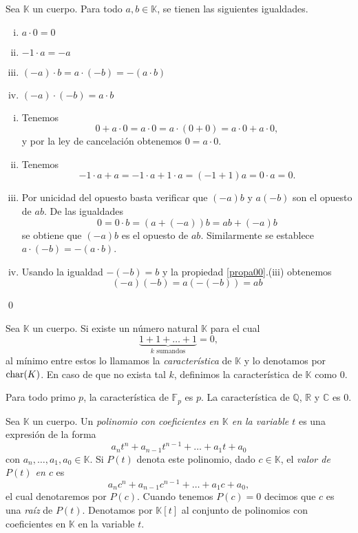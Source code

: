 \begin{prop}\label{propa00}
Sea $\mathbb{K}$ un cuerpo. Para todo $a,b\in \mathbb{K}$, se tienen las siguientes igualdades.
\begin{enumerate}[(i)]
\item $a\cdot 0=0$
\item $-1\cdot a=-a$
\item $(-a)\cdot b=a\cdot(-b)=-(a\cdot b)$
\item $(-a)\cdot (-b)=a\cdot b$
\end{enumerate}
\end{prop}

\dem
\begin{enumerate}[(i)]
\item Tenemos
\[
0+a\cdot 0=a\cdot 0=a\cdot (0+0)=a\cdot 0+ a\cdot 0,
\]
y por la ley de cancelación obtenemos $0=a\cdot 0$.
\item Tenemos
\[
-1\cdot a+a=-1\cdot a+1\cdot a=(-1+1)a=0\cdot a=0.
\]
\item Por unicidad del opuesto basta verificar que $(-a)b$ y $a(-b)$ son el opuesto de $ab$. De las igualdades
\[
0=0\cdot b=\left( a+(-a)\right) b=ab+(-a)b
\]
se obtiene que $(-a)b$ es el opuesto de $ab$. Similarmente se establece $a\cdot(-b)=-(a\cdot b)$.
\item Usando la igualdad $-(-b)=b$ y la propiedad \ref{propa00}.(iii) obtenemos
\[
(-a)(-b)=a\left(-(-b)\right) =ab
\]
\end{enumerate}\qed

\begin{defn}
Sea $\mathbb{K}$ un cuerpo. Si existe un número natural $\mathbb{K}$ para el cual
\[
\underbrace{1+1+\ldots+1}_{k \textrm{ sumandos}}=0,
\]
al mínimo entre estos lo llamamos la \emph{característica} de $\mathbb{K}$ y lo denotamos por $\operatorname{char}(K)$. En caso de que no exista tal $k$, definimos la característica de $\mathbb{K}$ como $0$.   
\end{defn}

\begin{obs}
Para todo primo $p$, la característica de $\mathbb{F}_p$ es $p$. La característica de $\mathbb{Q}$, $\mathbb{R}$ y $\mathbb{C}$ es $0$.
\end{obs}

\begin{defn}
Sea $\mathbb{K}$ un cuerpo. Un \emph{polinomio con coeficientes en $\mathbb{K}$ en la variable $t$} es una expresión de la forma
$$a_nt^n+a_{n-1}t^{n-1}+\ldots+a_1t+a_0$$
con $a_n,\ldots,a_1,a_0\in\mathbb{K}$. Si $P(t)$ denota este polinomio, dado $c\in \mathbb{K}$, el \emph{valor de $P(t)$ en $c$} es
$$a_nc^n+a_{n-1}c^{n-1}+\ldots+a_1c+a_0,$$
el cual denotaremos por $P(c)$. Cuando tenemos $P(c)=0$ decimos que $c$ es una \emph{raíz} de $P(t)$. Denotamos por $\mathbb{K}[t]$ al conjunto de polinomios con coeficientes en $\mathbb{K}$ en la variable $t$.
\end{defn}

